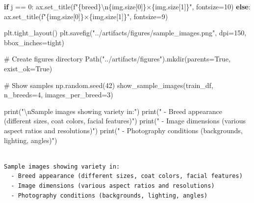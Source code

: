 \documentclass[
  letterpaper,
  DIV=11,
  numbers=noendperiod]{scrartcl}
\newenvironment{Shaded}{\begin{snugshade}}{\end{snugshade}}
\newcommand{\BuiltInTok}[1]{\textcolor[rgb]{0.00,0.23,0.31}{#1}}
\newcommand{\CharTok}[1]{\textcolor[rgb]{0.13,0.47,0.30}{#1}}
\newcommand{\CommentTok}[1]{\textcolor[rgb]{0.37,0.37,0.37}{#1}}
\newcommand{\ControlFlowTok}[1]{\textcolor[rgb]{0.00,0.23,0.31}{\textbf{#1}}}
\newcommand{\DecValTok}[1]{\textcolor[rgb]{0.68,0.00,0.00}{#1}}
\newcommand{\NormalTok}[1]{\textcolor[rgb]{0.00,0.23,0.31}{#1}}
\newcommand{\OperatorTok}[1]{\textcolor[rgb]{0.37,0.37,0.37}{#1}}
\newcommand{\SpecialCharTok}[1]{\textcolor[rgb]{0.37,0.37,0.37}{#1}}
\newcommand{\SpecialStringTok}[1]{\textcolor[rgb]{0.13,0.47,0.30}{#1}}
\newcommand{\StringTok}[1]{\textcolor[rgb]{0.13,0.47,0.30}{#1}}
\newcommand{\VariableTok}[1]{\textcolor[rgb]{0.07,0.07,0.07}{#1}}
\renewenvironment{Shaded}{%
  \begin{tcolorbox}[%
    enhanced,%
    colback=codebg,%
    colframe=codebg,%
    borderline west={3pt}{0pt}{sectionblue},%
    boxrule=0pt,%
    arc=0pt,%
    boxsep=5pt,%
    left=2mm,%
    right=2mm,%
    top=2mm,%
    bottom=2mm%
  ]%
}{%
  \end{tcolorbox}%
}
\begin{document}
\begin{Shaded}
\begin{Highlighting}[]
            \ControlFlowTok{if}\NormalTok{ j }\OperatorTok{==} \DecValTok{0}\NormalTok{:}
\NormalTok{                ax.set\_title(}\SpecialStringTok{f"}\SpecialCharTok{\{}\NormalTok{breed}\SpecialCharTok{\}}\CharTok{\textbackslash{}n}\SpecialCharTok{\{}\NormalTok{img}\SpecialCharTok{.}\NormalTok{size[}\DecValTok{0}\NormalTok{]}\SpecialCharTok{\}}\SpecialStringTok{×}\SpecialCharTok{\{}\NormalTok{img}\SpecialCharTok{.}\NormalTok{size[}\DecValTok{1}\NormalTok{]}\SpecialCharTok{\}}\SpecialStringTok{"}\NormalTok{, fontsize}\OperatorTok{=}\DecValTok{10}\NormalTok{)}
            \ControlFlowTok{else}\NormalTok{:}
\NormalTok{                ax.set\_title(}\SpecialStringTok{f"}\SpecialCharTok{\{}\NormalTok{img}\SpecialCharTok{.}\NormalTok{size[}\DecValTok{0}\NormalTok{]}\SpecialCharTok{\}}\SpecialStringTok{×}\SpecialCharTok{\{}\NormalTok{img}\SpecialCharTok{.}\NormalTok{size[}\DecValTok{1}\NormalTok{]}\SpecialCharTok{\}}\SpecialStringTok{"}\NormalTok{, fontsize}\OperatorTok{=}\DecValTok{9}\NormalTok{)}
    
\NormalTok{    plt.tight\_layout()}
\NormalTok{    plt.savefig(}\StringTok{"../artifacts/figures/sample\_images.png"}\NormalTok{, dpi}\OperatorTok{=}\DecValTok{150}\NormalTok{, bbox\_inches}\OperatorTok{=}\StringTok{\textquotesingle{}tight\textquotesingle{}}\NormalTok{)}

\CommentTok{\# Create figures directory}
\NormalTok{Path(}\StringTok{"../artifacts/figures"}\NormalTok{).mkdir(parents}\OperatorTok{=}\VariableTok{True}\NormalTok{, exist\_ok}\OperatorTok{=}\VariableTok{True}\NormalTok{)}

\CommentTok{\# Show samples}
\NormalTok{np.random.seed(}\DecValTok{42}\NormalTok{)}
\NormalTok{show\_sample\_images(train\_df, n\_breeds}\OperatorTok{=}\DecValTok{4}\NormalTok{, images\_per\_breed}\OperatorTok{=}\DecValTok{3}\NormalTok{)}

\BuiltInTok{print}\NormalTok{(}\StringTok{"}\CharTok{\textbackslash{}n}\StringTok{Sample images showing variety in:"}\NormalTok{)}
\BuiltInTok{print}\NormalTok{(}\StringTok{"  {-} Breed appearance (different sizes, coat colors, facial features)"}\NormalTok{)}
\BuiltInTok{print}\NormalTok{(}\StringTok{"  {-} Image dimensions (various aspect ratios and resolutions)"}\NormalTok{)}
\BuiltInTok{print}\NormalTok{(}\StringTok{"  {-} Photography conditions (backgrounds, lighting, angles)"}\NormalTok{)}
\end{Highlighting}
\end{Shaded}

\begin{verbatim}

Sample images showing variety in:
  - Breed appearance (different sizes, coat colors, facial features)
  - Image dimensions (various aspect ratios and resolutions)
  - Photography conditions (backgrounds, lighting, angles)
\end{verbatim}
\end{document}
